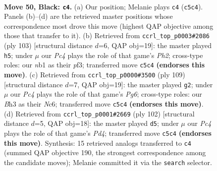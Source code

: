 \documentclass[11pt]{article}
\begin{document}
\clearpage

\begin{figure}[p]\centering
\begin{subfigure}{0.46\textwidth}\centering
\resizebox{\linewidth}{!}{%
\newchessgame
\chessboard[
  setfen={8/4B1k1/p7/2p5/8/7b/5K2/1N6 b - - 1 50},
  showmover=false,
  pgfstyle=straightmove, color=movearrow, markmove={c5-c4}
]}
\caption{}
\end{subfigure}\hfill
\begin{subfigure}{0.46\textwidth}\centering
\resizebox{\linewidth}{!}{%
\newchessgame
\chessboard[
  setfen={7k/7p/1b3p2/5B2/8/5P2/8/5K2 b - - 3 52},
  showmover=false,
  pgfstyle=straightmove, color=movearrow, markmove={h7-h5}
]}
\caption{}
\end{subfigure}
\\[4pt]
\begin{subfigure}{0.46\textwidth}\centering
\resizebox{\linewidth}{!}{%
\newchessgame
\chessboard[
  setfen={8/8/2n1k3/8/8/1K3Pp1/8/4B3 b - - 1 55},
  showmover=false,
  pgfstyle=straightmove, color=movearrow, markmove={g3-g2}
]}
\caption{}
\end{subfigure}\hfill
\begin{subfigure}{0.46\textwidth}\centering
\resizebox{\linewidth}{!}{%
\newchessgame
\chessboard[
  setfen={8/3k4/8/8/p2P2K1/8/Bb6/8 w - - 1 52},
  showmover=false,
  pgfstyle=straightmove, color=movearrow, markmove={d4-d5}
]}
\caption{}
\end{subfigure}
\caption{\textbf{Move 50, Black: \texttt{c4}.} (a) Our position; Melanie plays \texttt{c4} (\texttt{c5c4}). Panels (b)--(d) are the retrieved master positions whose correspondence most drove this move (highest QAP objective among those that transfer to it). (b) Retrieved from \texttt{ccrl\_top\_p0003\#2086} (ply 103) [structural distance $d$=6, QAP obj=19]: the master played \texttt{h5}; under $\mu$ our \emph{Pc4} plays the role of that game's \emph{Ph2}; cross-type roles: our \emph{n}b1 as their \emph{p}f3; transferred move \texttt{c5c4} \textbf{(endorses this move)}. (c) Retrieved from \texttt{ccrl\_top\_p0000\#3500} (ply 109) [structural distance $d$=7, QAP obj=19]: the master played \texttt{g2}; under $\mu$ our \emph{Pc4} plays the role of that game's \emph{Pg6}; cross-type roles: our \emph{B}h3 as their \emph{N}c6; transferred move \texttt{c5c4} \textbf{(endorses this move)}. (d) Retrieved from \texttt{ccrl\_top\_p0001\#2669} (ply 102) [structural distance $d$=5, QAP obj=18]: the master played \texttt{d5}; under $\mu$ our \emph{Pc4} plays the role of that game's \emph{Pd4}; transferred move \texttt{c5c4} \textbf{(endorses this move)}. Synthesis: 15 retrieved analogs transferred to \texttt{c4} (summed QAP objective 190, the strongest correspondence among the candidate moves); Melanie committed it via the \texttt{search} selector.}
\label{fig:thought-m99}
\end{figure}
\end{document}

